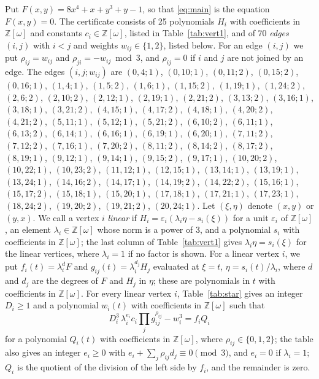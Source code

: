 \documentclass[11pt]{article}
\newcommand{\Z}{\mathbb{Z}}
\begin{document}
Put $F(x,y)=8x^{4}+x+y^{3}+y-1$, so that \eqref{eq:main} is the equation $F(x,y)=0$. The certificate consists of 25 polynomials $H_i$ with coefficients in $\Z[\omega]$ and constants $c_i\in\Z[\omega]$, listed in Table~\ref{tab:vert1}, and of 70 \emph{edges} $(i,j)$ with $i<j$ and weights $w_{ij}\in\{1,2\}$, listed below. For an edge $(i,j)$ we put $\rho_{ij}=w_{ij}$ and $\rho_{ji}=-w_{ij}\bmod 3$, and $\rho_{ij}=0$ if $i$ and $j$ are not joined by an edge.
The edges $(i,j;w_{ij})$ are $(0,4;1)$, $(0,10;1)$, $(0,11;2)$, $(0,15;2)$, $(0,16;1)$, $(1,4;1)$, $(1,5;2)$, $(1,6;1)$, $(1,15;2)$, $(1,19;1)$, $(1,24;2)$, $(2,6;2)$, $(2,10;2)$, $(2,12;1)$, $(2,19;1)$, $(2,21;2)$, $(3,13;2)$, $(3,16;1)$, $(3,18;1)$, $(3,21;2)$, $(4,15;1)$, $(4,17;2)$, $(4,18;1)$, $(4,20;2)$, $(4,21;2)$, $(5,11;1)$, $(5,12;1)$, $(5,21;2)$, $(6,10;2)$, $(6,11;1)$, $(6,13;2)$, $(6,14;1)$, $(6,16;1)$, $(6,19;1)$, $(6,20;1)$, $(7,11;2)$, $(7,12;2)$, $(7,16;1)$, $(7,20;2)$, $(8,11;2)$, $(8,14;2)$, $(8,17;2)$, $(8,19;1)$, $(9,12;1)$, $(9,14;1)$, $(9,15;2)$, $(9,17;1)$, $(10,20;2)$, $(10,22;1)$, $(10,23;2)$, $(11,12;1)$, $(12,15;1)$, $(13,14;1)$, $(13,19;1)$, $(13,24;1)$, $(14,16;2)$, $(14,17;1)$, $(14,19;2)$, $(14,22;2)$, $(15,16;1)$, $(15,17;2)$, $(15,18;1)$, $(15,20;1)$, $(17,18;1)$, $(17,21;1)$, $(17,23;1)$, $(18,24;2)$, $(19,20;2)$, $(19,21;2)$, $(20,24;1)$.
Let $(\xi,\eta)$ denote $(x,y)$ or $(y,x)$. We call a vertex $i$ \emph{linear} if $H_i=\varepsilon_i(\lambda_i\eta-s_i(\xi))$ for a unit $\varepsilon_i$ of $\Z[\omega]$, an element $\lambda_i\in\Z[\omega]$ whose norm is a power of $3$, and a polynomial $s_i$ with coefficients in $\Z[\omega]$; the last column of Table~\ref{tab:vert1} gives $\lambda_i\eta=s_i(\xi)$ for the linear vertices, where $\lambda_i=1$ if no factor is shown. For a linear vertex $i$, we put $f_i(t)=\lambda_i^{d}F$ and $g_{ij}(t)=\lambda_i^{d_j}H_j$ evaluated at $\xi=t$, $\eta=s_i(t)/\lambda_i$, where $d$ and $d_j$ are the degrees of $F$ and $H_j$ in $\eta$; these are polynomials in $t$ with coefficients in $\Z[\omega]$.
For every linear vertex $i$, Table~\ref{tab:star} gives an integer $D_i\geq1$ and a polynomial $w_i(t)$ with coefficients in $\Z[\omega]$ such that
\begin{equation}\label{eq:starlin}
D_i^3\,\lambda_i^{e_i}c_i\prod_jg_{ij}^{\rho_{ij}}-w_i^3=f_iQ_i
\end{equation}
for a polynomial $Q_i(t)$ with coefficients in $\Z[\omega]$, where $\rho_{ij}\in\{0,1,2\}$; the table also gives an integer $e_i\geq0$ with $e_i+\sum_j\rho_{ij}d_j\equiv0\pmod3$, and $e_i=0$ if $\lambda_i=1$; $Q_i$ is the quotient of the division of the left side by $f_i$, and the remainder is zero.
\end{document}
